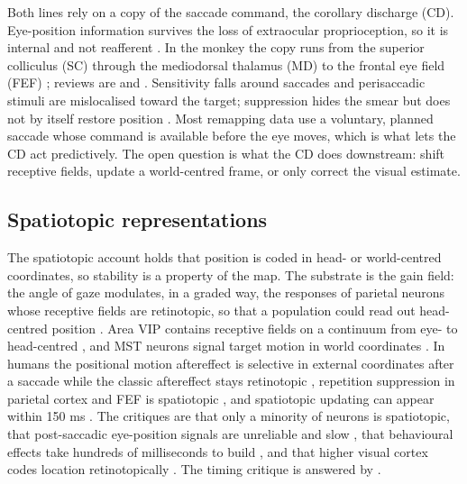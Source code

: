 \documentclass[14pt]{article}
\begin{document}
Both lines rely on a copy of the saccade command, the corollary discharge (CD).
Eye-position information survives the loss of extraocular proprioception, so it is internal and not reafferent \citep{guthrieCorollaryDischargeProvides1983}.
In the monkey the copy runs from the superior colliculus (SC) through the mediodorsal thalamus (MD) to the frontal eye field (FEF) \citep{sommerPathwayPrimateBrain2002,sommerWhatBrainStem2004,sommerInfluenceThalamusSpatial2006}; reviews are \citet{crapseCorollaryDischargeAnimal2008} and \citet{sunCorollaryDischargeOculomotor2016}.
Sensitivity falls around saccades and perisaccadic stimuli are mislocalised toward the target; suppression hides the smear but does not by itself restore position \citep{rossChangesVisualPerception2001,bindaVisionSaccadicEye2018}.
Most remapping data use a voluntary, planned saccade whose command is available before the eye moves, which is what lets the CD act predictively.
The open question is what the CD does downstream: shift receptive fields, update a world-centred frame, or only correct the visual estimate.

\subsection{Spatiotopic representations}

The spatiotopic account holds that position is coded in head- or world-centred coordinates, so stability is a property of the map.
The substrate is the gain field: the angle of gaze modulates, in a graded way, the responses of parietal neurons whose receptive fields are retinotopic, so that a population could read out head-centred position \citep{andersenInfluenceAngleGaze1983}.
Area VIP contains receptive fields on a continuum from eye- to head-centred \citep{duhamelSpatialInvarianceVisual1997}, and MST neurons signal target motion in world coordinates \citep{ilgPosteriorParietalCortex2004}.
In humans the positional motion aftereffect is selective in external coordinates after a saccade while the classic aftereffect stays retinotopic \citep{turiSpatiotopicPerceptualMaps2012}, repetition suppression in parietal cortex and FEF is spatiotopic \citep{fairhallSpatiotopicUpdatingSaccades2017}, and spatiotopic updating can appear within 150 ms \citep{fabiusTimeCourseSpatiotopic2019}.
The critiques are that only a minority of neurons is spatiotopic, that post-saccadic eye-position signals are unreliable and slow \citep{xuPostsaccadicUnreliabilityGain2012,morrisDynamicsEyepositionSignals2012}, that behavioural effects take hundreds of milliseconds to build \citep{zimmermannSpatiotopicNeuralRepresentations2013}, and that higher visual cortex codes location retinotopically \citep{golombHigherLevelVisual2012}.
The timing critique is answered by \citet{fabiusTimeCourseSpatiotopic2019}.
\end{document}
